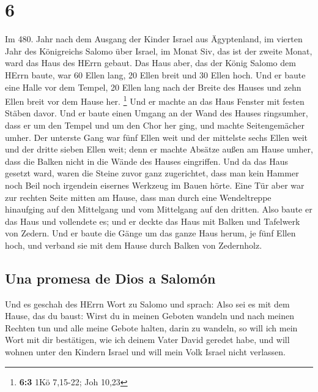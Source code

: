 \hypertarget{section-5}{%
\section{6}\label{section-5}}

 Im 480. Jahr nach dem Ausgang der Kinder Israel aus
Ägyptenland, im vierten Jahr des Königreichs Salomo über Israel, im
Monat Siv, das ist der zweite Monat, ward das Haus des HErrn gebaut.
 Das Haus aber, das der König Salomo dem HErrn baute, war
60 Ellen lang, 20 Ellen breit und 30 Ellen hoch.  Und er
baute eine Halle vor dem Tempel, 20 Ellen lang nach der Breite des
Hauses und zehn Ellen breit vor dem Hause her. \footnote{\textbf{6:3}
  1Kö 7,15-22; Joh 10,23}  Und er machte an das Haus
Fenster mit festen Stäben davor.  Und er baute einen
Umgang an der Wand des Hauses ringsumher, dass er um den Tempel und um
den Chor her ging, und machte Seitengemächer umher.  Der
unterste Gang war fünf Ellen weit und der mittelste sechs Ellen weit und
der dritte sieben Ellen weit; denn er machte Absätze außen am Hause
umher, dass die Balken nicht in die Wände des Hauses eingriffen.
 Und da das Haus gesetzt ward, waren die Steine zuvor ganz
zugerichtet, dass man kein Hammer noch Beil noch irgendein eisernes
Werkzeug im Bauen hörte.  Eine Tür aber war zur rechten
Seite mitten am Hause, dass man durch eine Wendeltreppe hinaufging auf
den Mittelgang und vom Mittelgang auf den dritten.  Also
baute er das Haus und vollendete es; und er deckte das Haus mit Balken
und Tafelwerk von Zedern.  Und er baute die Gänge um das
ganze Haus herum, je fünf Ellen hoch, und verband sie mit dem Hause
durch Balken von Zedernholz.

\hypertarget{una-promesa-de-dios-a-salomuxf3n}{%
\subsection{Una promesa de Dios a
Salomón}\label{una-promesa-de-dios-a-salomuxf3n}}

 Und es geschah des HErrn Wort zu Salomo und sprach:
 Also sei es mit dem Hause, das du baust: Wirst du in
meinen Geboten wandeln und nach meinen Rechten tun und alle meine Gebote
halten, darin zu wandeln, so will ich mein Wort mit dir bestätigen, wie
ich deinem Vater David geredet habe,  und will wohnen
unter den Kindern Israel und will mein Volk Israel nicht verlassen.

